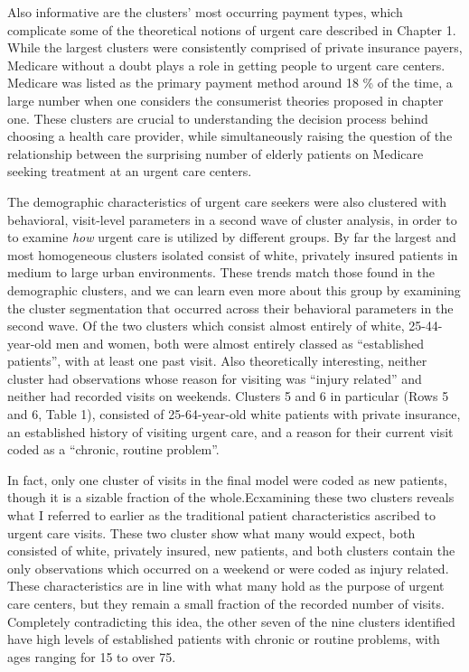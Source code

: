 \documentclass[12pt,twoside]{reedthesis}
\begin{document}
  Also informative are the clusters' most occurring payment types, which
  complicate some of the theoretical notions of urgent care described in
  Chapter 1. While the largest clusters were consistently comprised of
  private insurance payers, Medicare without a doubt plays a role in
  getting people to urgent care centers. Medicare was listed as the
  primary payment method around 18 \% of the time, a large number when one
  considers the consumerist theories proposed in chapter one. These
  clusters are crucial to understanding the decision process behind
  choosing a health care provider, while simultaneously raising the
  question of the relationship between the surprising number of elderly
  patients on Medicare seeking treatment at an urgent care centers.
  
  The demographic characteristics of urgent care seekers were also
  clustered with behavioral, visit-level parameters in a second wave of
  cluster analysis, in order to to examine \emph{how} urgent care is
  utilized by different groups. By far the largest and most homogeneous
  clusters isolated consist of white, privately insured patients in medium
  to large urban environments. These trends match those found in the
  demographic clusters, and we can learn even more about this group by
  examining the cluster segmentation that occurred across their behavioral
  parameters in the second wave. Of the two clusters which consist almost
  entirely of white, 25-44-year-old men and women, both were almost
  entirely classed as ``established patients'', with at least one past
  visit. Also theoretically interesting, neither cluster had observations
  whose reason for visiting was ``injury related'' and neither had
  recorded visits on weekends. Clusters 5 and 6 in particular (Rows 5 and
  6, Table 1), consisted of 25-64-year-old white patients with private
  insurance, an established history of visiting urgent care, and a reason
  for their current visit coded as a ``chronic, routine problem''.
  
  In fact, only one cluster of visits in the final model were coded as new
  patients, though it is a sizable fraction of the whole.Ecxamining these
  two clusters reveals what I referred to earlier as the traditional
  patient characteristics ascribed to urgent care visits. These two
  cluster show what many would expect, both consisted of white, privately
  insured, new patients, and both clusters contain the only observations
  which occurred on a weekend or were coded as injury related. These
  characteristics are in line with what many hold as the purpose of urgent
  care centers, but they remain a small fraction of the recorded number of
  visits. Completely contradicting this idea, the other seven of the nine
  clusters identified have high levels of established patients with
  chronic or routine problems, with ages ranging for 15 to over 75.
  
\end{document}
